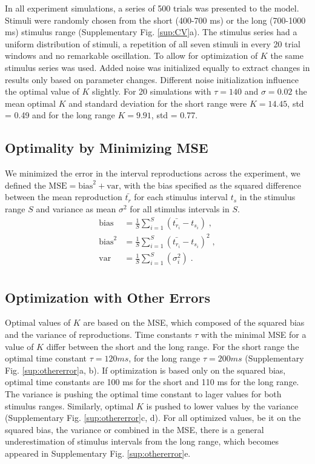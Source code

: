 \documentclass[10pt]{article}
\begin{document}
In all experiment simulations, a series of 500 trials was presented to the model.
Stimuli were randomly chosen from the short (400-700 ms) or the long (700-1000 ms) stimulus range (Supplementary Fig. \ref{sup:CV}a).
The stimulus series had a uniform distribution of stimuli, a repetition of all seven stimuli in every 20 trial windows and no remarkable oscillation.
To allow for optimization of $K$ the same stimulus series was used. Added noise was initialized equally to extract changes in results only based on parameter changes.
Different noise initialization influence the optimal value of $K$ slightly. For 20 simulations with $\tau=140$ and $\sigma=0.02$ the mean optimal $K$ and standard deviation for the short range were $K = 14.45$, std = 0.49 and for the long range $K = 9.91$, std = 0.77. 

\subsection*{Optimality by Minimizing MSE}
We minimized the error in the interval reproductions across the experiment, we defined the $\text{MSE} = \text{bias}^2+\text{var}$, with the bias specified as the squared difference between the mean reproduction $\bar{t_{r}}$ for each stimulus interval $t_s$ in the stimulus range $S$ and variance as mean $\sigma^2$ for all stimulus intervals in $S$.
\begin{equation} \label{MSE}
	\begin{split}
	 \text{bias} & = \frac{1}{S} \sum \limits_{i=1}^{S} (\bar{t_{r_i}} - t_{s_i}) \;,\\
	 \text{bias}^2 & = \frac{1}{S} \sum \limits_{i=1}^{S}(\bar{t_{r_i}} - t_{s_i})^2 \;,\\
	 \text{var} & = \frac{1}{S} \sum \limits_{i=1}^{S}(\sigma_i^2) \;.\\
	\end{split}
\end{equation}

\subsection*{Optimization with Other Errors}
Optimal values of $K$ are based on the MSE, which composed of the squared bias and the variance of reproductions. 
Time constants $\tau$ with the minimal MSE for a value of $K$ differ between the short and the long range. For the short range the optimal time constant $\tau = 120 ms$, for the long range $\tau = 200 ms$ (Supplementary Fig. \ref{sup:othererror}a, b). If optimization is based only on the squared bias, optimal time constants are 100 ms for the short and 110 ms for the long range. 
The variance is pushing the optimal time constant to lager values for both stimulus ranges. 
Similarly, optimal $K$ is pushed to lower values by the variance (Supplementary Fig. \ref{sup:othererror}c, d).
For all optimized values, be it on the squared bias, the variance or combined in the MSE, there is a general underestimation of stimulus intervals from the long range, which becomes appeared in Supplementary Fig. \ref{sup:othererror}e.
\end{document}

